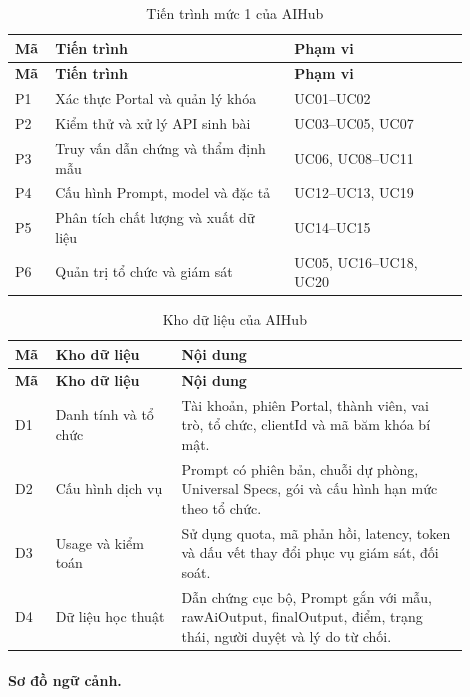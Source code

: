 \begin{longtable}{|>{\raggedright\arraybackslash}p{0.07\linewidth}|p{0.48\linewidth}|p{0.35\linewidth}|}
\caption{Tiến trình mức 1 của AIHub}\label{aihub:tab:dfd-processes}\\
\hline
\textbf{Mã} & \textbf{Tiến trình} & \textbf{Phạm vi} \\
\hline
\endfirsthead
\hline
\textbf{Mã} & \textbf{Tiến trình} & \textbf{Phạm vi} \\
\hline
\endhead
P1 & Xác thực Portal và quản lý khóa & UC01--UC02 \\
\hline
P2 & Kiểm thử và xử lý API sinh bài & UC03--UC05, UC07 \\
\hline
P3 & Truy vấn dẫn chứng và thẩm định mẫu & UC06, UC08--UC11 \\
\hline
P4 & Cấu hình Prompt, model và đặc tả & UC12--UC13, UC19 \\
\hline
P5 & Phân tích chất lượng và xuất dữ liệu & UC14--UC15 \\
\hline
P6 & Quản trị tổ chức và giám sát & UC05, UC16--UC18, UC20 \\
\hline
\end{longtable}


\begin{longtable}{|>{\raggedright\arraybackslash}p{0.07\linewidth}|p{0.25\linewidth}|p{0.58\linewidth}|}
\caption{Kho dữ liệu của AIHub}\label{aihub:tab:dfd-stores}\\
\hline
\textbf{Mã} & \textbf{Kho dữ liệu} & \textbf{Nội dung} \\
\hline
\endfirsthead
\hline
\textbf{Mã} & \textbf{Kho dữ liệu} & \textbf{Nội dung} \\
\hline
\endhead
D1 & Danh tính và tổ chức & Tài khoản, phiên Portal, thành viên, vai trò, tổ chức, clientId và mã băm khóa bí mật. \\
\hline
D2 & Cấu hình dịch vụ & Prompt có phiên bản, chuỗi dự phòng, Universal Specs, gói và cấu hình hạn mức theo tổ chức. \\
\hline
D3 & Usage và kiểm toán & Sử dụng quota, mã phản hồi, latency, token và dấu vết thay đổi phục vụ giám sát, đối soát. \\
\hline
D4 & Dữ liệu học thuật & Dẫn chứng cục bộ, Prompt gắn với mẫu, rawAiOutput, finalOutput, điểm, trạng thái, người duyệt và lý do từ chối. \\
\hline
\end{longtable}


\clearpage

\paragraph{Sơ đồ ngữ cảnh.}

